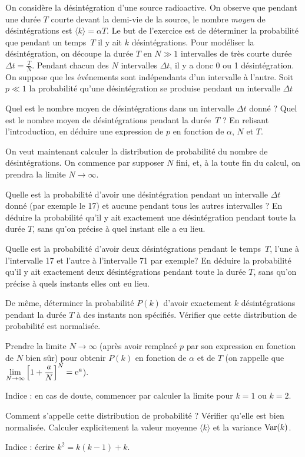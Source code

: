 On considère la désintégration d'une source radioactive. On observe que pendant une durée $T$ courte devant la demi-vie de la source, le nombre \emph{moyen} de désintégrations est $\langle k \rangle =\alpha T$. Le but de l'exercice est de déterminer la probabilité que pendant un temps~$T$ il y ait $k$ désintégrations. Pour modéliser la désintégration, on découpe la durée $T$ en $N\gg1$ intervalles de très courte durée $\Delta t=\frac{T}{N}$. Pendant chacun des $N$ intervalles $\Delta t$, il y a donc 0 ou 1 désintégration. On suppose que les événements sont indépendants d'un intervalle à l'autre. Soit $p\ll1$ la probabilité qu'une désintégration se produise pendant un intervalle $\Delta t$

\medskip

\question
Quel est le nombre moyen de désintégrations dans un intervalle $\Delta t$ donné ?  Quel est le nombre moyen de désintégrations pendant la durée~$T$ ? En relisant l'introduction, en déduire une expression de $p$ en fonction de $\alpha$, $N$ et $T$.\label{decrad1}

\medskip

On veut maintenant calculer la distribution de probabilité du nombre de désintégrations. On commence par supposer $N$ fini, et, à la toute fin du calcul, on prendra la limite $N\to\infty$.

\question
Quelle est la probabilité d'avoir une désintégration pendant un intervalle $\Delta t$ donné (par exemple le 17) et aucune pendant tous les autres intervalles ? En déduire la probabilité qu'il y ait exactement une désintégration pendant toute la durée $T$, sans qu'on précise à quel instant elle a eu lieu.\label{decrad2}

\question
Quelle est la probabilité d'avoir deux désintégrations pendant le temps~$T$, l'une à l'intervalle 17 et l'autre à l'intervalle 71 par exemple? En déduire la probabilité qu'il y ait exactement deux désintégrations pendant toute la durée $T$, sans qu'on précise à quels instants elles ont eu lieu. \label{decrad3}

\question
De même, déterminer la probabilité $P(k)$ d'avoir exactement $k$ désintégrations pendant la durée $T$ à des instants non spécifiés. Vérifier que cette distribution de probabilité est normalisée.

\question
Prendre la limite $N\to\infty$ (après avoir remplacé $p$ par son expression en fonction de $N$ bien sûr) pour obtenir $P(k)$ en fonction de $\alpha$ et de $T$ (on rappelle que $\displaystyle \lim_{N\to\infty}\Big[1+\frac a N\Big]^N={\rm e}^a$).

Indice : en cas de doute, commencer par calculer la limite pour $k=1$ ou $k=2$.

\question
Comment s'appelle cette distribution de probabilité ? Vérifier qu'elle est bien normalisée. Calculer explicitement la valeur moyenne $\langle k\rangle$ et la variance ${\rm Var}(k)$.

Indice : écrire \mbox{$k^2=k(k-1)+k$}.
